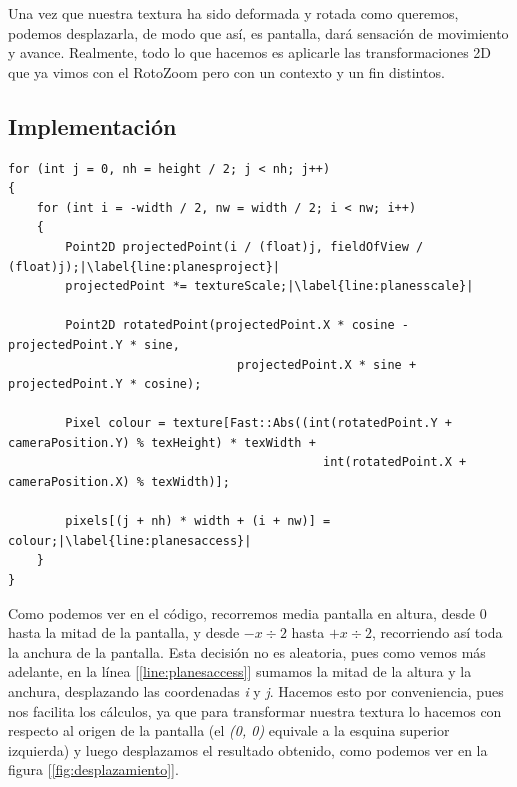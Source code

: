 Una vez que nuestra textura ha sido deformada y rotada como queremos, podemos desplazarla, de modo que así, es pantalla, dará sensación de movimiento y avance. Realmente, todo lo que hacemos es aplicarle las transformaciones 2D que ya vimos con el RotoZoom pero con un contexto y un fin distintos.

\subsection{Implementación}

\begin{lstlisting}[style=C-color, caption={Código para generar un efecto básico de planos infinitos, con escalado, rotación y translación}, label=cod:infiniteplanes, escapechar=|]
for (int j = 0, nh = height / 2; j < nh; j++)
{
    for (int i = -width / 2, nw = width / 2; i < nw; i++)
    {
        Point2D projectedPoint(i / (float)j, fieldOfView / (float)j);|\label{line:planesproject}|
        projectedPoint *= textureScale;|\label{line:planesscale}|
        
        Point2D rotatedPoint(projectedPoint.X * cosine - projectedPoint.Y * sine,
                                projectedPoint.X * sine + projectedPoint.Y * cosine);
                             
        Pixel colour = texture[Fast::Abs((int(rotatedPoint.Y + cameraPosition.Y) % texHeight) * texWidth +
                                            int(rotatedPoint.X + cameraPosition.X) % texWidth)];
                                         
        pixels[(j + nh) * width + (i + nw)] = colour;|\label{line:planesaccess}|
    }
}
\end{lstlisting}

Como podemos ver en el código, recorremos media pantalla en altura, desde 0 hasta la mitad de la pantalla, y desde \(-x \div 2\) hasta \(+x \div 2\), recorriendo así toda la anchura de la pantalla. Esta decisión no es aleatoria, pues como vemos más adelante, en la línea [\ref{line:planesaccess}] sumamos la mitad de la altura y la anchura, desplazando las coordenadas \emph{i} y \emph{j}. Hacemos esto por conveniencia, pues nos facilita los cálculos, ya que para transformar nuestra textura lo hacemos con respecto al origen de la pantalla (el \emph{(0, 0)} equivale a la esquina superior izquierda) y luego desplazamos el resultado obtenido, como podemos ver en la figura [\ref{fig:desplazamiento}].\\

